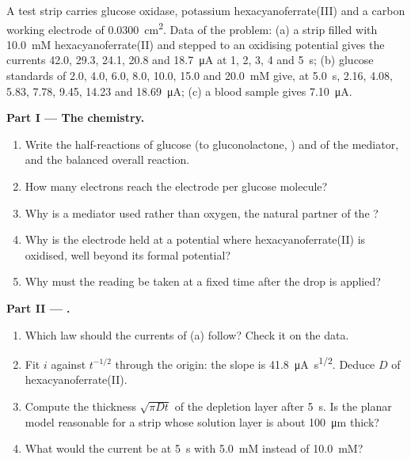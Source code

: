 \begin{problem}
\label{pb:b3:electrode-kinetics:1}
A test strip carries glucose oxidase, potassium hexacyanoferrate(III) and a
carbon working electrode of \qty{0.0300}{cm^2}. Data of the problem: (a) a strip
filled with \qty{10.0}{mM} hexacyanoferrate(II) and stepped to an oxidising potential
gives the currents 42.0, 29.3, 24.1, 20.8 and \qty{18.7}{\micro A} at 1, 2, 3, 4 and \qty{5}{s};
(b) glucose standards of 2.0, 4.0, 6.0, 8.0, 10.0, 15.0 and \qty{20.0}{mM} give, at
\qty{5.0}{s}, 2.16, 4.08, 5.83, 7.78, 9.45, 14.23 and \qty{18.69}{\micro A}; (c) a blood sample gives
\qty{7.10}{\micro A}.

\medskip\noindent\textbf{Part I --- The chemistry.}
\begin{enumerate}
  \item Write the half-reactions of glucose (to gluconolactone, ) and of
        the mediator, and the balanced overall reaction.
  \item How many electrons reach the electrode per glucose molecule?
  \item Why is a mediator used rather than oxygen, the natural partner of
        the ?
  \item Why is the electrode held at a potential where hexacyanoferrate(II)
        is oxidised, well beyond its formal potential?
  \item Why must the reading be taken at a fixed time after the drop is
        applied?
\end{enumerate}

\medskip\noindent\textbf{Part II --- .}
\begin{enumerate}[resume]
  \item Which law should the currents of (a) follow? Check it on the data.
  \item Fit $i$ against $t^{-1/2}$ through the origin: the slope is \qty{41.8}{\micro A.s^{1/2}}. Deduce
        $D$ of hexacyanoferrate(II).
  \item Compute the thickness $\sqrt{\pi Dt}$ of the depletion layer after \qty{5}{s}. Is the
        planar model reasonable for a strip whose solution layer is about
        \qty{100}{\micro m} thick?
  \item What would the current be at \qty{5}{s} with \qty{5.0}{mM} instead of \qty{10.0}{mM}?
\end{enumerate}


\end{problem}
